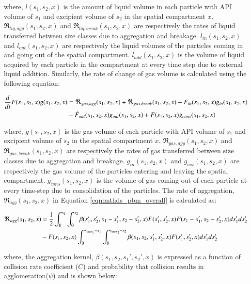 \documentclass[preprint,10pt,authoryear,review]{elsarticle}
\begin{document}
\begin{linenumbers}
where, $l(s_1,s_2,x)$ is the amount of liquid volume in each particle with API volume of $s_1$ and 
excipient volume of $s_2$ in the spatial compartment $x$. $\Re_{liq,agg}(s_1,s_2,x)$ and 
$\Re_{liq,break}(s_1,s_2,x)$ are respectively the rates of liquid transferred between size classes due to 
aggregation and breakage. $l_{in}(s_1,s_2,x)$ and $l_{out}(s_1,s_2,x)$ are respectively the liquid 
volumes of the particles coming in and going out of the spatial compartment. $l_{add}(s_1,s_2,x)$ is 
the volume of liquid acquired by each particle in the compartment at every time step due to external 
liquid addition.
Similarly, the rate of change of gas volume is calculated using the following equation: 

\begin{align}
\frac{d}{dt}F(s_1,s_2,x)g(s_1,s_2,x)&= 
\Re_{gas,agg}(s_1,s_2,x)+\Re_{gas,break}(s_1,s_2,x)+\dot{F}_{in}(s_1,s_2,x)g_{in}(s_1,s_2,x)\notag\\
&-\dot{F}_{out}(s_1,s_2,x)g_{out}(s_1,s_2,x)+F(s_1,s_2,x)\dot{g}_{cons}(s_1,s_2,x)
\label{eqn:mthds_pbm_gas_agg} 
\end{align}

where, $g(s_1,s_2,x)$ is the gas volume of each particle with API volume of $s_1$ and excipient 
volume of $s_2$ in the spatial compartment $x$. $\Re_{gas,agg}(s_1,s_2,x)$ and 
$\Re_{gas,break}(s_1,s_2,x)$ are respectively the rates of gas transferred between size classes due to 
aggregation and breakage. $g_{in}(s_1,s_2,x)$ and $g_{out}(s_1,s_2,x)$ are respectively the gas 
volume of the particles entering and leaving the spatial compartment. $\dot{g}_{cons}(s_1,s_2,x)$ is the 
volume of gas coming out of each particle at every time-step due to consolidation of the particles. 
The rate of aggregation, $\Re_{agg}(s_1,s_2,x)$ in Equation \ref{eqn:mthds_pbm_overall} is 
calculated as: \citep{Chaturbedi2017}

\begin{align}
\Re_{agg}(s_1,s_2,x)&= \frac{1}{2}\int _0^{s_1} \int_0^{s_2} 
\beta(s_1',s_2',s_1-s_1',s_2-s_2',x)F(s_1',s_2',x)F(s_1-s_1',s_2-s_2',x)ds_1'ds_2'\notag\\ 
&- F(s_1,s_2,x)\int _0^{s_{max_1}-s_1} \int_0^{s_{max_2}-s_2} 
\beta(s_1,s_2,s_1',s_2',x)F(s_1',s_2',x)ds_1'ds_2'
\label{eqn:mthds_R_agg}
\end{align}


where, the aggregation kernel, $\beta(s_1,s_2, s_1',s_2',x)$ is expressed as a function of collision 
rate coefficient ($C$) and probability that collision results in agglomeration($\psi$) \citep{ingram2005}
and is shown below: 


\end{linenumbers}
\end{document}
